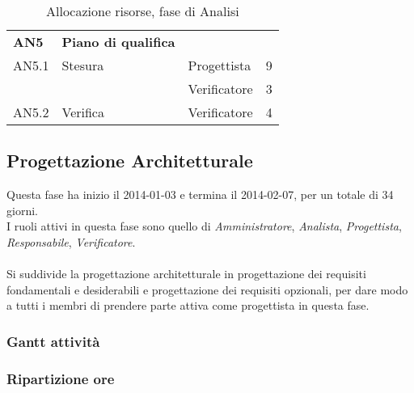 \begin{table}[H]
\begin{tabular}{ l l l c  }
	\hline
	\textbf{AN5} & \textbf{Piano di qualifica} \\
	\cline{3-4}
	AN5.1 & Stesura & Progettista& 9\\ 
    & & Verificatore & 3 \\
    \cline{3-4}
	AN5.2 & Verifica & Verificatore &  4\\
	
	\hline
	\end{tabular}
	\caption{Allocazione risorse, fase di Analisi}
	\end{table}

	\subsection{Progettazione Architetturale}
	
Questa fase ha inizio il 2014-01-03 e termina il 2014-02-07, per un totale di 34  giorni. \\
I ruoli attivi in questa fase sono quello di \textit{Amministratore}, \textit{Analista}, \textit{Progettista}, \textit{Responsabile}, \textit{Verificatore}. \\ \\
Si suddivide la progettazione architetturale in progettazione dei requisiti fondamentali e desiderabili e progettazione dei requisiti opzionali, per dare modo a tutti i membri di prendere parte attiva come progettista in questa fase.
	
\subsubsection{Gantt attività}
	
\subsubsection{Ripartizione ore}
	
